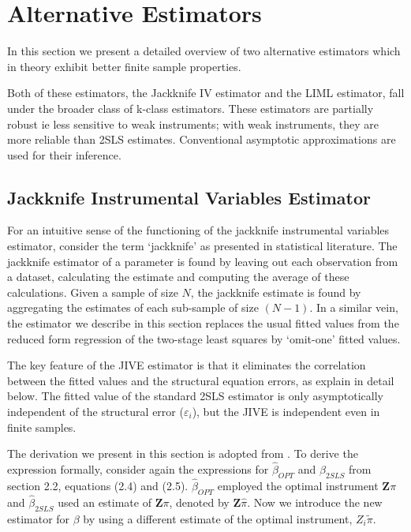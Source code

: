 \section{Alternative Estimators}
In this section we present a detailed overview of two alternative estimators which in theory exhibit better finite sample properties. 
\par Both of these estimators, the Jackknife IV estimator and the LIML estimator, fall under the broader class of k-class estimators. These estimators are partially robust ie less sensitive to weak instruments; with weak instruments, they are more reliable than 2SLS estimates. Conventional asymptotic approximations are used for their inference.

\subsection{Jackknife Instrumental Variables Estimator}
For an intuitive sense of the functioning of the jackknife instrumental variables estimator, consider the term `jackknife' as presented in statistical literature. The  jackknife estimator of a parameter is found by leaving out each observation from a dataset, calculating the estimate and computing the average of these calculations. Given a sample of size $N$, the jackknife estimate is found by aggregating the estimates of each sub-sample of size $(N-1)$. In a similar vein, the estimator we describe in this section replaces the usual fitted values from the reduced form regression of the two-stage least squares by `omit-one' fitted values.
\par The key feature of the JIVE estimator is that it eliminates the correlation between the fitted values and the structural equation errors, as explain in detail below. The fitted value of the standard 2SLS estimator is only asymptotically independent of the structural error ($\varepsilon_i$), but the JIVE is independent even in finite samples.
\par The derivation we present in this section is adopted from \cite{angrist1999jackknife}. To derive the expression formally, consider again the expressions for $\hat\beta_{OPT}$ and $\hat\beta_{2SLS}$ from section 2.2, equations (2.4) and (2.5). $\hat\beta_{OPT}$ employed the optimal instrument $\mathbf Z\pi$ and $\hat\beta_{2SLS}$ used an estimate of $\mathbf Z\pi$, denoted by $\mathbf Z\hat \pi$. Now we introduce the new estimator for $\beta$ by using a different estimate of the optimal instrument, $Z_{i}\tilde{\pi}$. 

